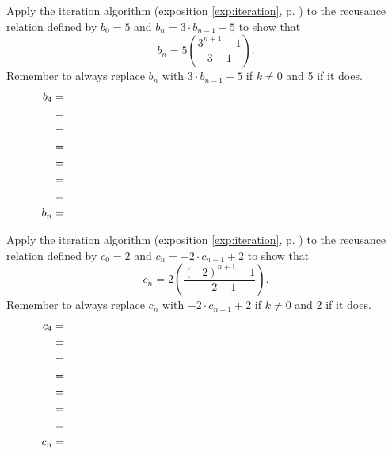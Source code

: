 \clearpage

\begin{practiceprob} Apply the iteration algorithm (exposition \ref{exp:iteration}, p. \pageref{exp:iteration}) to the recusance relation defined by \(b_0=5\) and \(b_n=3\cdot b_{n-1} +5\) to show that \[b_n=5\left(\frac{3^{n+1}-1}{3-1}\right).\]
Remember to always replace \(b_n\) with \(3\cdot b_{n-1} +5\) if \(k\neq 0\) and 5 if it does.
\addtolength{\jot}{50pt}
    \begin{align*}
        b_4 &= \\
            &= \\
            &= \\
            &= \\
            &= \\
            &= \\
            &= \\
        b_n &= \hspace*{0.8\textwidth}
    \end{align*}\vspace{10pt}
\end{practiceprob}

\clearpage

\begin{practiceprob} Apply the iteration algorithm (exposition \ref{exp:iteration}, p. \pageref{exp:iteration}) to the recusance relation defined by \(c_0=2\) and \(c_n=-2\cdot c_{n-1} +2\) to show that \[c_n=2\left(\frac{(-2)^{n+1}-1}{-2-1}\right).\]
Remember to always replace \(c_n\) with \(-2\cdot c_{n-1} +2\) if \(k\neq 0\) and 2 if it does.
\addtolength{\jot}{50pt}
    \begin{align*}
        c_4 &= \\
            &= \\
            &= \\
            &= \\
            &= \\
            &= \\
            &= \\
        c_n &= \hspace*{0.8\textwidth}
    \end{align*}\vspace{10pt}
\end{practiceprob}

\clearpage

